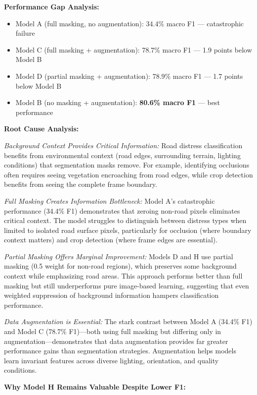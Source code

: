 \documentclass[12pt]{article}
\begin{document}
\textbf{Performance Gap Analysis:}
\begin{itemize}[itemsep=1pt,parsep=0pt,topsep=2pt]
\item Model A (full masking, no augmentation): 34.4\% macro F1 — catastrophic failure
\item Model C (full masking + augmentation): 78.7\% macro F1 — 1.9 points below Model B
\item Model D (partial masking + augmentation): 78.9\% macro F1 — 1.7 points below Model B
\item Model B (no masking + augmentation): \textbf{80.6\% macro F1} — best performance
\end{itemize}

\textbf{Root Cause Analysis:}

\textit{Background Context Provides Critical Information:} Road distress classification benefits from environmental context (road edges, surrounding terrain, lighting conditions) that segmentation masks remove. For example, identifying occlusions often requires seeing vegetation encroaching from road edges, while crop detection benefits from seeing the complete frame boundary.

\textit{Full Masking Creates Information Bottleneck:} Model A's catastrophic performance (34.4\% F1) demonstrates that zeroing non-road pixels eliminates critical context. The model struggles to distinguish between distress types when limited to isolated road surface pixels, particularly for occlusion (where boundary context matters) and crop detection (where frame edges are essential).

\textit{Partial Masking Offers Marginal Improvement:} Models D and H use partial masking (0.5 weight for non-road regions), which preserves some background context while emphasizing road areas. This approach performs better than full masking but still underperforms pure image-based learning, suggesting that even weighted suppression of background information hampers classification performance.

\textit{Data Augmentation is Essential:} The stark contrast between Model A (34.4\% F1) and Model C (78.7\% F1)—both using full masking but differing only in augmentation—demonstrates that data augmentation provides far greater performance gains than segmentation strategies. Augmentation helps models learn invariant features across diverse lighting, orientation, and quality conditions.

\textbf{Why Model H Remains Valuable Despite Lower F1:}
\end{document}
